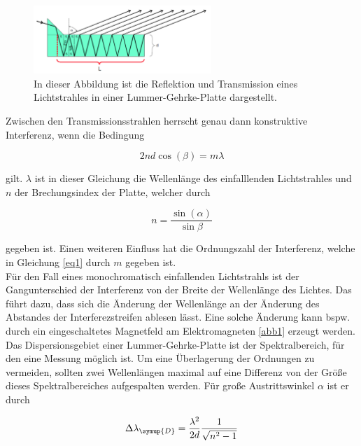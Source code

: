 \begin{figure}
    \centering
    \includegraphics[width=0.6\textwidth]{figure/LGP.pdf}
    \caption{In dieser Abbildung ist die Reflektion und Transmission eines 
    Lichtstrahles in einer Lummer-Gehrke-Platte dargestellt.}
    \label{abb2}
\end{figure}

Zwischen den Transmissionsstrahlen herrscht genau dann 
konstruktive Interferenz, wenn die Bedingung

\begin{equation}
    2nd \cos(\beta) = m \lambda
    \label{eq1}
\end{equation}

gilt. $\lambda$ ist in dieser Gleichung die Wellenlänge des 
einfalllenden Lichtstrahles und $n$ der Brechungsindex der Platte, 
welcher durch 

\begin{equation}
    n = \frac{\sin(\alpha)}{\sin{\beta}}
    \label{eq2}
\end{equation}

gegeben ist. Einen weiteren Einfluss hat die Ordnungszahl der 
Interferenz, welche in Gleichung \ref{eq1} durch $m$
gegeben ist.\\
Für den Fall eines monochromatisch einfallenden 
Lichtstrahls ist der Gangunterschied der Interferenz von der
Breite der Wellenlänge des Lichtes. 
Das führt dazu, dass sich die Änderung der Wellenlänge an der 
Änderung des Abstandes der Interferezstreifen ablesen lässt.
Eine solche Änderung kann bspw. durch ein eingeschaltetes 
Magnetfeld am Elektromagneten \ref{abb1} erzeugt werden.\\
Das Dispersionsgebiet einer Lummer-Gehrke-Platte ist 
der Spektralbereich, für den eine Messung möglich ist. 
Um eine Überlagerung der Ordnungen zu vermeiden, sollten 
zwei Wellenlängen maximal auf eine Differenz von der 
Größe dieses Spektralbereiches aufgespalten werden. 
Für große Austrittswinkel $\alpha$ ist er durch 

\begin{equation}
    \Delta \lambda_{\symup{D}} = \frac{\lambda^2}{2d} \frac{1}{\sqrt{n^2 -1}}
    \label{eq:del_Lam}
\end{equation}

